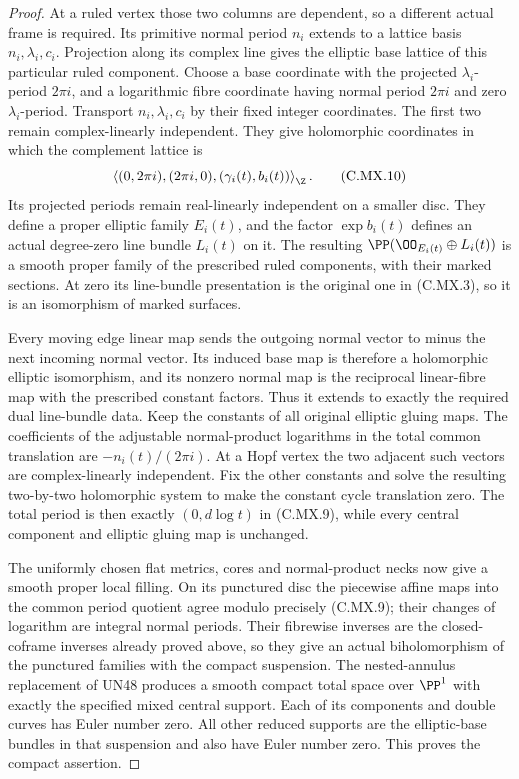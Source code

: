 \begin{proof}
At a ruled vertex those two columns are
dependent, so a different actual frame is
required. Its primitive normal period $n_i$
extends to a lattice basis $n_i,\lambda_i,c_i$.
Projection along its complex line gives the
elliptic base lattice of this particular
ruled component. Choose a base coordinate
with the projected $\lambda_i$-period $2\pi i$,
and a logarithmic fibre coordinate having
normal period $2\pi i$ and zero $\lambda_i$-period.
Transport $n_i,\lambda_i,c_i$ by their fixed
integer coordinates. The first two remain
complex-linearly independent. They give
holomorphic coordinates in which the complement
lattice is
\[
        \left\langle
          (0,2\pi i),(2\pi i,0),
                      (\gamma_i(t),b_i(t))
                                  \right\rangle_{\Z} .   \tag{C.MX.10}
\]
Its projected periods remain real-linearly
independent on a smaller disc. They define
a proper elliptic family $E_i(t)$, and the
factor $\exp b_i(t)$ defines an actual
degree-zero line bundle $L_i(t)$ on it.
The resulting
$\PP(\OO_{E_i(t)}\oplus L_i(t))$ is a smooth
proper family of the prescribed ruled
components, with their marked sections.
At zero its line-bundle presentation is
the original one in (C.MX.3), so it is
an isomorphism of marked surfaces.

Every moving edge linear map sends the
outgoing normal vector to minus the next
incoming normal vector. Its induced base
map is therefore a holomorphic elliptic
isomorphism, and its nonzero normal map
is the reciprocal linear-fibre map with
the prescribed constant factors. Thus it
extends to exactly the required dual
line-bundle data. Keep the constants of
all original elliptic gluing maps.
The coefficients of the adjustable
normal-product logarithms in the total
common translation are
$-n_i(t)/(2\pi i)$. At a Hopf vertex
the two adjacent such vectors are
complex-linearly independent. Fix the
other constants and solve the resulting
two-by-two holomorphic system to make
the constant cycle translation zero.
The total period is then exactly
$(0,d\log t)$ in (C.MX.9), while every
central component and elliptic gluing
map is unchanged.

The uniformly chosen flat metrics, cores
and normal-product necks now give a
smooth proper local filling. On its
punctured disc the piecewise affine
maps into the common period quotient
agree modulo precisely (C.MX.9);
their changes of logarithm are integral
normal periods. Their fibrewise inverses
are the closed-coframe inverses already
proved above, so they give an actual
biholomorphism of the punctured
families with the compact suspension.
The nested-annulus replacement of
UN48 produces a smooth compact total
space over $\PP^1$ with exactly the
specified mixed central support.
Each of its components and double
curves has Euler number zero. All
other reduced supports are the
elliptic-base bundles in that
suspension and also have Euler
number zero. This proves the
compact assertion.


\end{proof}
